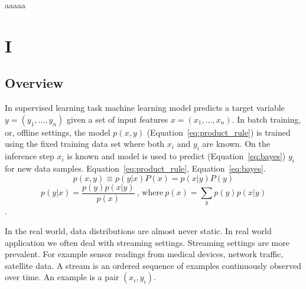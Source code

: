 \documentclass[doctoral,utf8,lot,loar,lof,shortloft,index]{jydiss}
\begin{document}
\preface

 aaaaa

\acknowledgements

\begin{notations}
\end{notations}

\mainmatter
\chapter{I}
\section{Overview}
In supervised learning task machine learning model predicts a target variable
$y = (y_1, \dots, y_n)$ given a set of input features $x = (x_1, \dots, x_n)$.
%
In batch training, or, offline settings, the model $p(x, y)$
(Equation~\ref{eq:product_rule}) is trained using the fixed training data set
where both $x_i$ and $y_i$ are known.  On the inference step $x_i$ is known and
model is used to predict (Equation~\ref{eq:bayes}) $y_i$ for new data samples. 
%
Equation~\ref{eq:product_rule}, Equation~\ref{eq:bayes}.
\begin{equation}\label{eq:product_rule}
  p(x,y) \equiv p(y|x)P(x) = p(x|y)P(y)
\end{equation}
\begin{equation}\label{eq:bayes}
  p(y | x) = \frac{p(y) p(x|y)}{p(x)}\: \text{, where}\: p(x)=\sum_{y} p(y) p(x|y)
\end{equation}.

In the real world, data distributions are almost never static. 
In real world application we often deal with streaming settings.
Streaming settings are more prevalent.
For example sensor readings from medical devices, network traffic, satellite data.
A stream is an ordered sequence of examples continuously observed over time. 
An example is a pair $(x_i, y_i)$.
\end{document}
